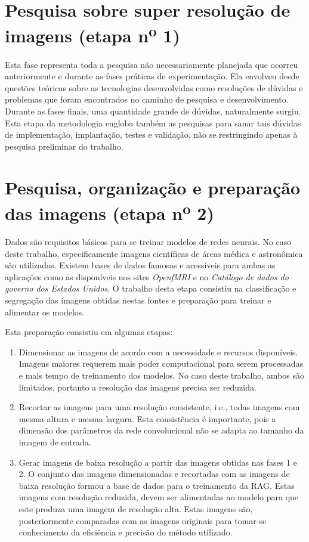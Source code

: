 \section{Pesquisa sobre super resolução de imagens (etapa n\textsuperscript{o} 1)}
\label{sec:procedimentos:pesquisa-super-resolucao}

Esta fase representa toda a pesquisa não necessariamente planejada que ocorreu anteriormente e durante as fases práticas de experimentação. Ela envolveu desde questões teóricas sobre as tecnologias desenvolvidas como resoluções de dúvidas e problemas que foram encontrados no caminho de pesquisa e desenvolvimento. Durante as fases finais, uma quantidade grande de dúvidas, naturalmente surgiu. Esta etapa da metodologia engloba também as pesquisas para sanar tais dúvidas de implementação, implantação, testes e validação, não se restringindo apenas à pesquisa preliminar do trabalho.

\section{Pesquisa, organização e preparação das imagens (etapa n\textsuperscript{o} 2)}
\label{sec:procedimentos:organizacao-preparacao-imagens}

Dados são requisitos básicos para se treinar modelos de redes neurais. No caso deste trabalho, especificamente  imagens científicas de áreas médica e astronômica são utilizadas. Existem bases de dados famosas e acessíveis para ambas as aplicações como as disponíveis nos sites \textit{OpenfMRI} e no \textit{Catálogo de dados do governo dos Estados Unidos}. O trabalho desta etapa consistiu na classificação e segregação das imagens obtidas nestas fontes e preparação para treinar e alimentar os modelos. 

Esta preparação consistiu em algumas etapas:

\begin{enumerate}
    \item Dimensionar as imagens de acordo com a necessidade e recursos disponíveis. Imagens maiores requerem mais poder computacional para serem processadas e mais tempo de treinamento dos modelos. No caso deste trabalho, ambos são limitados, portanto a resolução das imagens precisa ser reduzida.
    
    \item Recortar as imagens para uma resolução consistente, i.e., todas imagens com mesma altura e mesma largura. Esta consistência é importante, pois a dimensão dos parâmetros da rede convolucional não se adapta ao tamanho da imagem de entrada.
    
    \item Gerar imagens de baixa resolução a partir das imagens obtidas nas fases 1 e 2. O conjunto das imagens dimensionadas e recortadas com as imagens de baixa resolução formou a base de dados para o treinamento da RAG. Estas imagens com resolução reduzida, devem ser alimentadas ao modelo para que este produza uma imagem de resolução alta. Estas imagens são, posteriormente comparadas com as imagens originais para tomar-se conhecimento da eficiência e precisão do método utilizado.
    
\end{enumerate}

